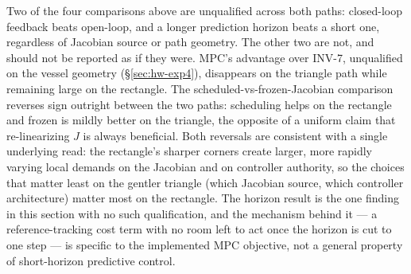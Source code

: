 \documentclass[journal]{IEEEtran}
\begin{document}
Two of the four comparisons above are unqualified across both paths:
closed-loop feedback beats open-loop, and a longer prediction horizon
beats a short one, regardless of Jacobian source or path geometry. The
other two are not, and should not be reported as if they were. MPC's
advantage over INV-7, unqualified on the vessel geometry
(\S\ref{sec:hw-exp4}), disappears on the triangle path while remaining
large on the rectangle. The scheduled-vs-frozen-Jacobian comparison
reverses sign outright between the two paths: scheduling helps on the
rectangle and frozen is mildly better on the triangle, the opposite of a
uniform claim that re-linearizing $J$ is always beneficial. Both
reversals are consistent with a single underlying read: the rectangle's
sharper corners create larger, more rapidly varying local demands on the
Jacobian and on controller authority, so the choices that matter least
on the gentler triangle (which Jacobian source, which controller
architecture) matter most on the rectangle. The horizon result is the one
finding in this section with no such qualification, and the mechanism
behind it --- a reference-tracking cost term with no room left to act
once the horizon is cut to one step --- is specific to the implemented
MPC objective, not a general property of short-horizon predictive
control.
\end{document}
